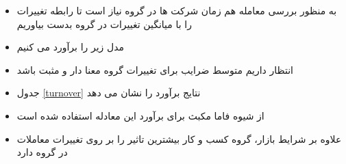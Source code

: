 \documentclass[12pt, a4paper]{article}
\begin{document}
\begin{itemize}
	\item
	به منظور بررسی معامله هم زمان شرکت ها در گروه نیاز است تا رابطه تغییرات 
	را با میانگین تغییرات 
	در گروه بدست بیاوریم
	\item 
	مدل زیر را برآورد می کنیم
	
	\item
	انتظار داریم متوسط ضرایب برای تغییرات
	گروه معنا دار و مثبت باشد
	\item
	جدول 
	\ref{turnover}
	نتایج برآورد را نشان می دهد
	\begin{LTR}
	\end{LTR}
	\item
	از شیوه فاما مکبث برای برآورد این معادله استفاده شده است
	\lr{\cite{FamaMacBeth}}
	\item
	علاوه بر شرایط بازار، گروه کسب و کار بیشترین تاثیر را بر روی تغییرات معاملات در گروه دارد
%
%		
%		
%
%					
%
%	






\end{itemize}
\end{document}

